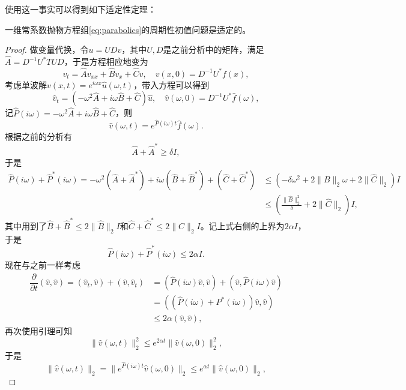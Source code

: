 \documentclass[a4paper,10pt]{ctexart}
\begin{document}
使用这一事实可以得到如下适定性定理：
\begin{theorem}
    一维常系数抛物方程组\eqref{eq:parabolics}的周期性初值问题是适定的。
\end{theorem}
\begin{proof}
    做变量代换，令$ u = UD v $，其中$ U,D $是之前分析中的矩阵，满足$ \hat{A} = D^{-1}U^*TUD $，于是方程相应地变为
    \[
        v_t = \hat{A}v_{xx} + \hat{B}v_x + \hat{C}v,\quad v(x,0) = D^{-1}U^*f(x),
    \]
    考虑单波解$ v(x,t) = e^{i \omega x}\hat{u}(\omega,t) $，带入方程可以得到
    \[
        \hat{v}_t = (-\omega^2 \hat{A} + i \omega \hat{B} + \hat{C}) \hat{u}, \quad \hat{v}(\omega,0) = D^{-1}U^*\hat{f}(\omega),
    \]
    记$ \hat{P}(i \omega) = - \omega^2 \hat{A} + i \omega \hat{B} + \hat{C} $，则
    \[
        \hat{v}(\omega,t) = e^{\hat{P}(i \omega)t}\hat{f}(\omega).
    \]
    根据之前的分析有
    \[
        \hat{A} + \hat{A}^* \geqslant \delta I,
    \]
    于是
    \begin{equation}
        \begin{aligned}
            \hat{P}(i \omega) + \hat{P}^*(i \omega)  = - \omega^2 (\hat{A} + \hat{A}^*) + i \omega(\hat{B} + \hat{B}^*) + (\hat{C} + \hat{C}^*) 
            &\leqslant  (-\delta \omega^2 + 2 \| B \|_2 \omega + 2 \|\hat{C}\|_2)I \\
            &\leqslant \left( \frac{\|\hat{B}\|_2^2}{\delta} + 2\|\hat{C}\|_2 \right) I,
        \end{aligned}
    \end{equation}
    其中用到了$ \hat{B} + \hat{B}^* \leqslant 2 \| \hat{B} \|_2 I $和$ \hat{C} + \hat{C}^* \leqslant 2 \| \hat{C} \|_2 I $。记上式右侧的上界为$ 2 \alpha I $，于是
    \[
        \hat{P}(i \omega) + \hat{P}^*(i \omega) \leqslant 2 \alpha I.
    \]
    现在与之前一样考虑
    \[
        \begin{aligned}
            \dfrac{\partial }{\partial t} (\hat{v},\hat{v}) = (\hat{v}_t,\hat{v}) + (\hat{v},\hat{v}_t) 
            &= (\hat{P}(i \omega)\hat{v},\hat{v}) + (\hat{v},\hat{P}(i \omega)\hat{v})\\
            &= ((\hat{P}(i \omega)+P^*(i \omega))\hat{v}, \hat{v})\\
            &\leqslant 2\alpha (\hat{v},\hat{v}),
        \end{aligned}
    \]
    再次使用引理可知
    \[
        \| \hat{v}(\omega,t) \|_2^2 \leqslant e^{2\alpha t} \| \hat{v}(\omega,0) \|_2^2 ,  
    \]
    于是
    \[
        \| \hat{v}(\omega,t) \|_2 = \| e^{\hat{P}(i \omega)t} \hat{v}(\omega,0) \|_2 \leqslant e^{\alpha t} \| \hat{v}(\omega,0) \|_2,
\]
\end{proof}
\end{document}
